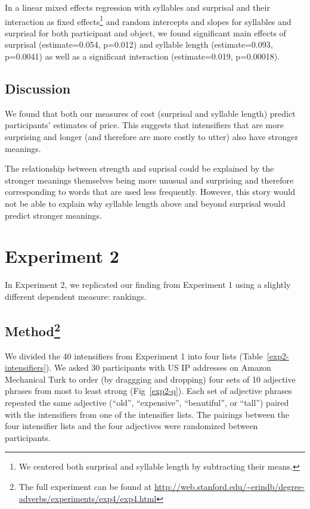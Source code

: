 \documentclass[10pt,letterpaper]{article}
\begin{document}
In a linear mixed effects regression with syllables and surprisal and their interaction as fixed effects\footnote{We centered both surprisal and syllable length by subtracting their means.} and random intercepts and slopes for syllables and surprisal for both participant and object, we found significant main effects of surprisal (estimate=0.054, p=0.012) and syllable length  (estimate=0.093, p=0.0041) as well as a significant interaction (estimate=0.019, p=0.00018).

\subsection{Discussion}

We found that both our measures of cost (surprisal and syllable length) predict participants' estimates of price.
This suggests that intensifiers that are more surprising and longer (and therefore are more costly to utter) also have stronger meanings.

The relationship between strength and suprisal could be explained by the stronger meanings themselves being more unusual and surprising and therefore corresponding to words that are used less frequently.
However, this story would not be able to explain why syllable length above and beyond surprisal would predict stronger meanings.

\section{Experiment 2}

In Experiment 2, we replicated our finding from Experiment 1 using a slightly different dependent measure: rankings.

\subsection{Method\footnote{The full experiment can be found at \url{http://web.stanford.edu/~erindb/degree-adverbs/experiments/exp4/exp4.html}}}

We divided the 40 intensifiers from Experiment 1 into four lists (Table~\ref{exp2-intensifiers}). We asked 30 participants with US IP addresses on Amazon Mechanical Turk to order (by draggging and dropping) four sets of 10 adjective phrases from most to least strong (Fig~\ref{exp2-q}). Each set of adjective phrases repeated the same adjective (``old'', ``expensive'', ``beautiful'', or ``tall'') paired with the intensifiers from one of the intensifier lists. The pairings between the four intensifier lists and the four adjectives were randomized between participants.
\end{document}
